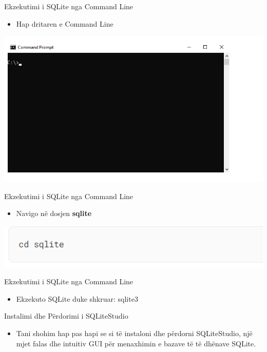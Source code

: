 \documentclass[
  ignorenonframetext,
]{beamer}
\providecommand{\tightlist}{%
  \setlength{\itemsep}{0pt}\setlength{\parskip}{0pt}}
\begin{document}
\begin{frame}{Ekzekutimi i SQLite nga Command Line}
\label{ekzekutimi-i-sqlite-nga-command-line}
\begin{itemize}
\tightlist
\item
  Hap dritaren e Command Line
\end{itemize}

\includegraphics{./Figs/sql3.png}
\end{frame}

\begin{frame}{Ekzekutimi i SQLite nga Command Line}
\label{ekzekutimi-i-sqlite-nga-command-line-1}
\begin{itemize}
\tightlist
\item
  Navigo në dosjen \textbf{sqlite}
\end{itemize}

\includegraphics{./Figs/sql4.png}
\end{frame}

\begin{frame}{Ekzekutimi i SQLite nga Command Line}
\label{ekzekutimi-i-sqlite-nga-command-line-2}
\begin{itemize}
\tightlist
\item
  Ekzekuto SQLite duke shkruar: sqlite3
\end{itemize}
\end{frame}

\begin{frame}{Instalimi dhe Përdorimi i SQLiteStudio}
\label{instalimi-dhe-puxebrdorimi-i-sqlitestudio}
\begin{itemize}
\tightlist
\item
  Tani shohim hap pas hapi se si të instaloni dhe përdorni SQLiteStudio,
  një mjet falas dhe intuitiv GUI për menaxhimin e bazave të të dhënave
  SQLite.
\end{itemize}
\end{frame}
\end{document}
